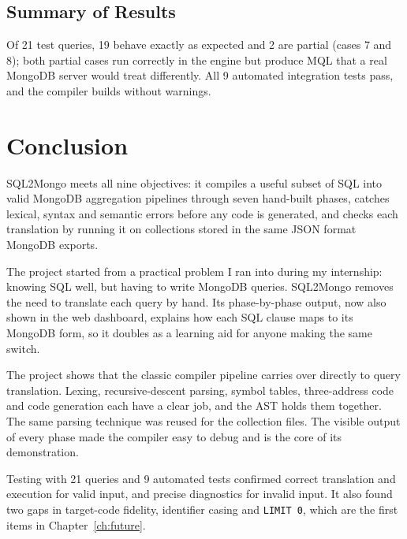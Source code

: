\documentclass[12pt,a4paper]{report}
\newcommand{\codeus}{\textunderscore\allowbreak}
\DeclareRobustCommand{\code}[1]{\texttt{\let\_\codeus #1}}
\begin{document}
\section{Summary of Results}
Of 21 test queries, 19 behave exactly as expected and 2 are partial (cases 7 and 8); both partial cases run correctly in the engine but produce MQL that a real MongoDB server would treat differently. All 9 automated integration tests pass, and the compiler builds without warnings.

\chapter{Conclusion}
SQL2Mongo meets all nine objectives: it compiles a useful subset of SQL into valid MongoDB aggregation pipelines through seven hand-built phases, catches lexical, syntax and semantic errors before any code is generated, and checks each translation by running it on collections stored in the same JSON format MongoDB exports.

The project started from a practical problem I ran into during my internship: knowing SQL well, but having to write MongoDB queries. SQL2Mongo removes the need to translate each query by hand. Its phase-by-phase output, now also shown in the web dashboard, explains how each SQL clause maps to its MongoDB form, so it doubles as a learning aid for anyone making the same switch.

The project shows that the classic compiler pipeline carries over directly to query translation. Lexing, recursive-descent parsing, symbol tables, three-address code and code generation each have a clear job, and the AST holds them together. The same parsing technique was reused for the collection files. The visible output of every phase made the compiler easy to debug and is the core of its demonstration.

Testing with 21 queries and 9 automated tests confirmed correct translation and execution for valid input, and precise diagnostics for invalid input. It also found two gaps in target-code fidelity, identifier casing and \code{LIMIT 0}, which are the first items in Chapter~\ref{ch:future}.

\end{document}
